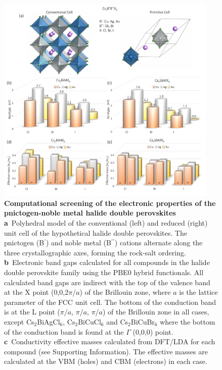 \documentclass[journal=jpcl,manuscript=letter,layout=traditional]{achemso}
\begin{document}
\begin{figure}[t!]
\begin{center}
\includegraphics[width=0.94\textwidth]{fig1.png}
\end{center}
\caption{\label{fig:1}
  \textbf{Computational screening of the electronic properties of the pnictogen-noble metal halide double perovskites\hspace{0.2cm}}\\
  \textbf{a}~Polyhedral model of the conventional (left) and reduced (right) unit cell of the hypothetical halide double perovskites.
  The pnictogen (B$^\prime$) and noble metal (B$^{\prime\prime}$) cations alternate along the three crystallographic axes, forming
  the rock-salt ordering.
  \textbf{b}~Electronic  band gaps calculated for all compounds in the halide double perovskite family using the PBE0 hybrid functionals.
  All calculated band gaps are indirect with the top of the valence band at the X point (0,0,$2\pi/a$) of the Brillouin zone, where $a$ is
  the lattice parameter of the FCC unit cell. The bottom of the conduction band is at the L point ($\pi/a$, $\pi/a$, $\pi/a$) of the
  Brillouin zone in all cases, except Cs$_2$BiAgCl$_6$, Cs$_2$BiCuCl$_6$ and Cs$_2$BiCuBr$_6$ where the bottom of the conduction band
  is found at the $\Gamma$ (0,0,0) point.
  \textbf{c}~Conductivity effective masses calculated from DFT/LDA for each compound (see Supporting Information). The effective masses
  are calculated at the VBM (holes) and CBM (electrons)  in each case.
}
\end{figure}
\end{document}
